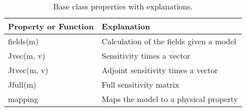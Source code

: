 \begin{table}[ht]
\caption{Base \Problem class properties with explanations.}
\label{table:Problem}
  \begin{tabular}{  p{3.5cm}  p{10cm} }
    \hline

    Property or Function & Explanation \\ \hline

    fields(m)   & Calculation of the fields given a model\\
    Jvec(m, v)  & Sensitivity times a vector\\
    Jtvec(m, v) & Adjoint sensitivity times a vector\\
    Jfull(m)    & Full sensitivity matrix\\
    mapping     & Maps the model to a physical property\\

    \hline
  \end{tabular}
\end{table}
